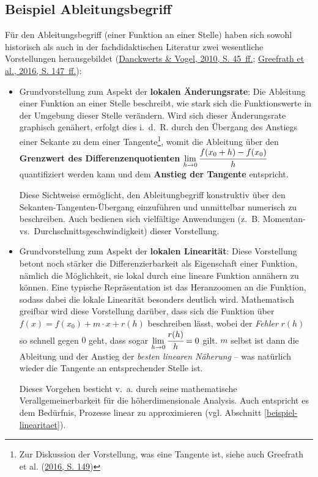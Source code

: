 \documentclass[
]{scrbook}
\theoremstyle{definition}
\theoremstyle{definition}
\theoremstyle{definition}
\theoremstyle{definition}
\theoremstyle{remark}
\begin{document}
\hypertarget{beispiel-ableitungsbegriff}{%
\subsection{Beispiel Ableitungsbegriff}\label{beispiel-ableitungsbegriff}}

Für den Ableitungsbegriff (einer Funktion an einer Stelle) haben sich sowohl historisch als auch in der fachdidaktischen Literatur zwei wesentliche Vorstellungen herausgebildet (\protect\hyperlink{ref-Danckwerts2010}{Danckwerts \& Vogel, 2010, S. 45~ff.}; \protect\hyperlink{ref-Greefrath2016}{Greefrath et al., 2016, S. 147~ff.}):

\begin{itemize}
\item
  Grundvorstellung zum Aspekt der \textbf{lokalen Änderungsrate}: Die Ableitung einer Funktion an einer Stelle beschreibt, wie stark sich die Funktionswerte in der Umgebung dieser Stelle verändern. Wird sich dieser Änderungsrate graphisch genähert, erfolgt dies i.~d.~R. durch den Übergang des Anstiegs einer Sekante zu dem einer Tangente\footnote{Zur Diskussion der Vorstellung, was eine Tangente ist, siehe auch Greefrath et al. (\protect\hyperlink{ref-Greefrath2016}{2016, S. 149})}, womit die Ableitung über den \textbf{Grenzwert des Differenzenquotienten} \(\lim\limits_{h\rightarrow 0}\cfrac{f(x_0+h)-f(x_0)}{h}\) quantifiziert werden kann und dem \textbf{Anstieg der Tangente} entspricht.

  Diese Sichtweise ermöglicht, den Ableitungbegriff konstruktiv über den Sekanten-Tangenten-Übergang einzuführen und unmittelbar numerisch zu beschreiben. Auch bedienen sich vielfältige Anwendungen (z.~B. Momentan- vs.~Durchschnittsgeschwindigkeit) dieser Vorstellung.
\item
  Grundvorstellung zum Aspekt der \textbf{lokalen Linearität}: Diese Vorstellung betont noch stärker die Differenzierbarkeit als Eigenschaft einer Funktion, nämlich die Möglichkeit, sie lokal durch eine lineare Funktion annähern zu können. Eine typische Repräsentation ist das Heranzoomen an die Funktion, sodass dabei die lokale Linearität besonders deutlich wird. Mathematisch greifbar wird diese Vorstellung darüber, dass sich die Funktion über \(f(x) = f(x_0) + m\cdot x+ r(h)\) beschreiben lässt, wobei der \emph{Fehler} \(r(h)\) so schnell gegen \(0\) geht, dass sogar \(\lim\limits_{h\rightarrow 0}\cfrac{r(h)}{h}=0\) gilt. \(m\) selbst ist dann die Ableitung und der Anstieg der \emph{besten linearen Näherung} -- was natürlich wieder die Tangente an entsprechender Stelle ist.

  Dieses Vorgehen besticht v.~a. durch seine mathematische Verallgemeinerbarkeit für die höherdimensionale Analysis. Auch entspricht es dem Bedürfnis, Prozesse linear zu approximieren (vgl. Abschnitt \ref{beispiel-linearitaet}).
\end{itemize}
\end{document}
